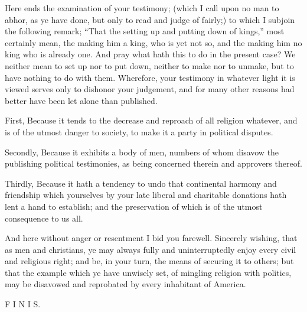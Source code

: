 \documentclass[12pt,oneside]{memoir}
\begin{document}
Here ends the examination of your testimony; (which I call upon no
man to abhor, as ye have done, but only to read and judge of fairly;)
to which I subjoin the following remark; ``That the setting up and
putting down of kings,'' most certainly mean, the making him a king,
who is yet not so, and the making him no king who is already one.
And pray what hath this to do in the present case? We neither mean
to set up nor to put down, neither to make nor to unmake, but to
have nothing to do with them. Wherefore, your testimony in whatever
light it is viewed serves only to dishonor your judgement, and for
many other reasons had better have been let alone than published.

First, Because it tends to the decrease and reproach of all religion
whatever, and is of the utmost danger to society, to make it a party
in political disputes.

Secondly, Because it exhibits a body of men, numbers of whom disavow
the publishing political testimonies, as being concerned therein and
approvers thereof.

Thirdly, Because it hath a tendency to undo that continental harmony
and friendship which yourselves by your late liberal and charitable
donations hath lent a hand to establish; and the preservation of
which is of the utmost consequence to us all.

And here without anger or resentment I bid you farewell. Sincerely
wishing, that as men and christians, ye may always fully and
uninterruptedly enjoy every civil and religious right; and be, in
your turn, the means of securing it to others; but that the example
which ye have unwisely set, of mingling religion with politics, may
be disavowed and reprobated by every inhabitant of America.

F  I  N  I  S.
\end{document}
